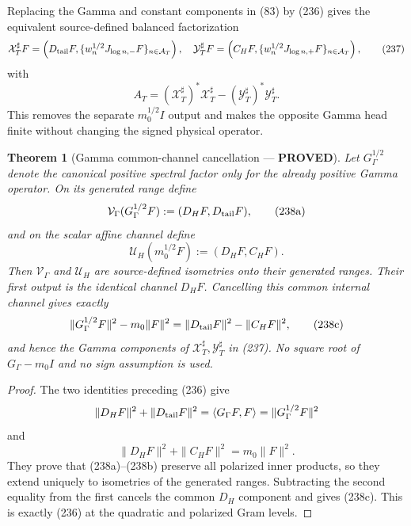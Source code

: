 \documentclass[11pt]{article}
\newtheorem{theorem}{Theorem}
\newcommand{\PROVED}{\textcolor{green!45!black}{\textbf{PROVED}}}
\begin{document}
Replacing the Gamma and constant components in (83) by (236) gives the
equivalent source-defined balanced factorization
\begin{equation}
 \mathcal X_T^\sharp F=
 \left(D_{\rm tail}F,\{w_n^{1/2}J_{\log n,-}F\}_{n\in\mathcal A_T}\right),
 \quad
 \mathcal Y_T^\sharp F=
 \left(C_HF,\{w_n^{1/2}J_{\log n,+}F\}_{n\in\mathcal A_T}\right), \tag{237}
\end{equation}
with
\begin{equation}
 A_T=(\mathcal X_T^\sharp)^*\mathcal X_T^\sharp
     -(\mathcal Y_T^\sharp)^*\mathcal Y_T^\sharp.    \tag{238}
\end{equation}
This removes the separate $m_0^{1/2}I$ output and makes the opposite Gamma
head finite without changing the signed physical operator.

\begin{theorem}[Gamma common-channel cancellation --- \PROVED]
Let $G_\Gamma^{1/2}$ denote the canonical positive spectral factor only for
the already positive Gamma operator.  On its generated range define
\begin{equation}
 \mathcal V_\Gamma(G_\Gamma^{1/2}F)
 :=(D_HF,D_{\rm tail}F),                              \tag{238a}
\end{equation}
and on the scalar affine channel define
\begin{equation}
 \mathcal U_H(m_0^{1/2}F):=(D_HF,C_HF).              \tag{238b}
\end{equation}
Then $\mathcal V_\Gamma$ and $\mathcal U_H$ are source-defined isometries
onto their generated ranges.  Their first output is the identical channel
$D_HF$.  Cancelling this common internal channel gives exactly
\begin{equation}
 \|G_\Gamma^{1/2}F\|^2-m_0\|F\|^2
 =\|D_{\rm tail}F\|^2-\|C_HF\|^2,                   \tag{238c}
\end{equation}
and hence the Gamma components of
$\mathcal X_T^\sharp,\mathcal Y_T^\sharp$ in (237).
No square root of $G_\Gamma-m_0I$ and no sign assumption is used.
\end{theorem}

\begin{proof}
The two identities preceding (236) give
\[
 \|D_HF\|^2+\|D_{\rm tail}F\|^2
 =\langle G_\Gamma F,F\rangle
 =\|G_\Gamma^{1/2}F\|^2
\]
and
\[
 \|D_HF\|^2+\|C_HF\|^2=m_0\|F\|^2.
\]
They prove that (238a)--(238b) preserve all polarized inner products, so
they extend uniquely to isometries of the generated ranges.  Subtracting the
second equality from the first cancels the common $D_H$ component and gives
(238c).  This is exactly (236) at the quadratic and polarized Gram levels.
\end{proof}
\end{document}
